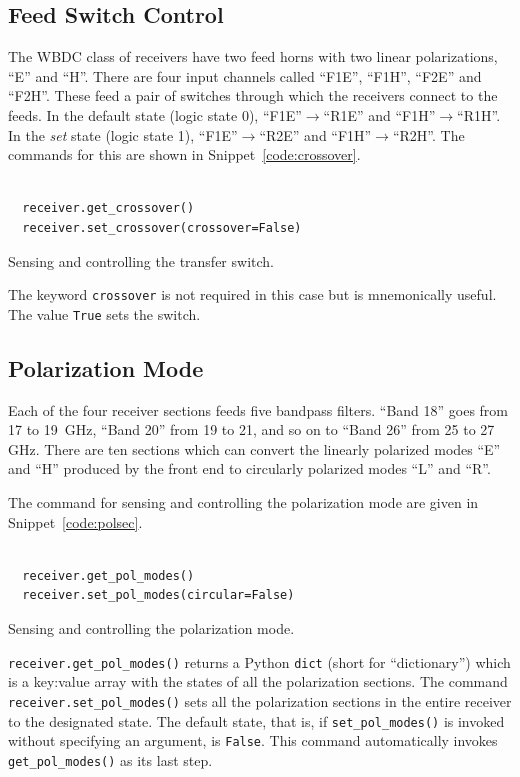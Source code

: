 \documentclass[letterpaper,11pt]{book}
\begin{document}
\subsection{Feed Switch Control}\label{subsec:feed_switch}

The WBDC class of receivers have two feed horns with two linear polarizations,
``E'' and ``H''.  There are four input channels called ``F1E'', ``F1H'',
``F2E'' and ``F2H''.  These feed a pair of switches through which the receivers
connect to the feeds.  In the default state (logic state 0),
``F1E''$\rightarrow$``R1E'' and ``F1H''$\rightarrow$``R1H''.  In the {\it set}
state (logic state 1), ``F1E''$\rightarrow$``R2E'' and 
``F1H''$\rightarrow$``R2H''.  The commands for this are shown in 
Snippet~\ref{code:crossover}.
\begin{code}[h!tb]
\begin{center}
  \begin{verbatim}
  
  receiver.get_crossover()
  receiver.set_crossover(crossover=False)\end{verbatim}
\caption{\label{code:crossover}Sensing and controlling the transfer switch.}
\end{center}
\end{code}
The keyword {\tt crossover} is not required in this case but is
mnemonically useful. The value {\tt True} sets the switch.

\subsection{Polarization Mode}

Each of the four receiver sections feeds five bandpass filters.
``Band 18'' goes from 17 to 19~GHz, ``Band 20'' from 19 to 21, and so on to
``Band 26'' from 25 to 27 GHz.  There are ten sections which can convert the
linearly polarized modes ``E'' and ``H'' produced by the front end to 
circularly polarized modes ``L'' and ``R''.  

The command for sensing and controlling the polarization mode are given in
Snippet~\ref{code:polsec}.
\begin{code}[h!tb]
\begin{center}
  \begin{verbatim}
  
  receiver.get_pol_modes()
  receiver.set_pol_modes(circular=False)\end{verbatim}
\caption{\label{code:polsec}Sensing and controlling the polarization mode.}
\end{center}
\end{code}
{\tt receiver.get\_pol\_modes()} returns a Python {\tt dict} (short for 
``dictionary'') which is a key:value  array with the states of all the 
polarization sections.  The command {\tt receiver.set\_pol\_modes()}
sets all the polarization sections in the entire receiver to the designated
state. The default state, that is, if {\tt set\_pol\_modes()} is invoked
without specifying an argument, is {\tt False}.  This command automatically 
invokes {\tt get\_pol\_modes()} as its last step.
\end{document}
